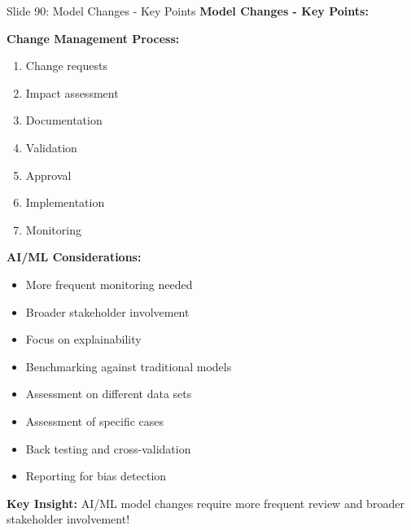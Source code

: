 \documentclass[8pt]{beamer}
\begin{document}
	\begin{frame}{Slide 90: Model Changes - Key Points}
		\fontsize{6.5}{7.5}\selectfont
		\textbf{Model Changes - Key Points:}
		
		\vspace{0.1cm}
		\textbf{Change Management Process:}
		\begin{enumerate}
			\item Change requests
			\item Impact assessment
			\item Documentation
			\item Validation
			\item Approval
			\item Implementation
			\item Monitoring
		\end{enumerate}
		
		\vspace{0.1cm}
		\textbf{AI/ML Considerations:}
		\begin{itemize}
			\item More frequent monitoring needed
			\item Broader stakeholder involvement
			\item Focus on explainability
			\item Benchmarking against traditional models
			\item Assessment on different data sets
			\item Assessment of specific cases
			\item Back testing and cross-validation
			\item Reporting for bias detection
		\end{itemize}
		
		\textcolor{myblue}{\textbf{Key Insight:}} AI/ML model changes require \textcolor{myblue}{more frequent review and broader stakeholder involvement}!
	\end{frame}
	
\end{document}
